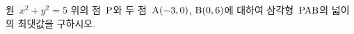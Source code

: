 원~$x^2+y^2=5$ 위의 점~$\mathrm{P}$와 두 점~$\mathrm{A}(-3{,}\mkern3mu\mathopen{}0)$, $\mathrm{B}(0{,}\mkern3mu\mathopen{}6)$에 대하여 삼각형~$\mathrm{PAB}$의 넓이의 최댓값을 구하시오.
